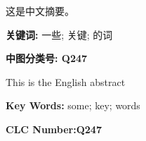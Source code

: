 这是中文摘要。

\bigskip
\noindent \textbf{关键词: \hspace{\Han}}
一些;\;
关键;\;
的词

\bigskip
\noindent \textbf{中图分类号: \hspace{\Han}Q247}

This is the English abstract

\bigskip
\noindent \textbf{Key Words:\hspace{\Han}}
some;\;
key;\;
words

\bigskip
\noindent \textbf{CLC Number:\hspace{\Han}Q247}
